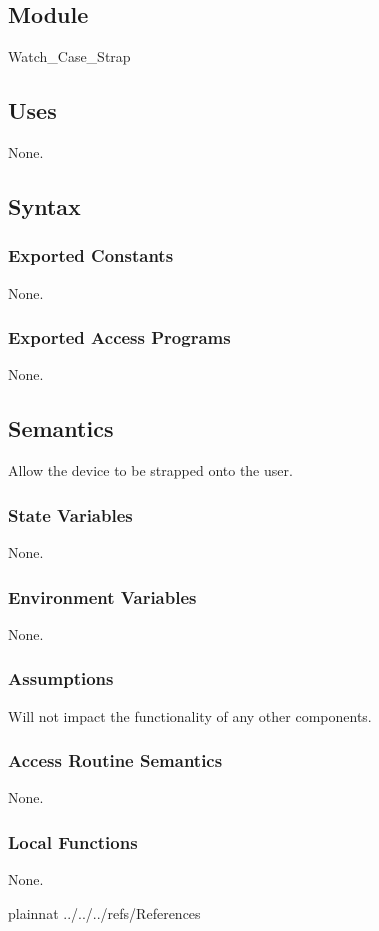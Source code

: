\documentclass[12pt, titlepage]{article}
\begin{document}
\subsection{Module}

Watch\_Case\_Strap

\subsection{Uses}

None.

\subsection{Syntax}


\subsubsection{Exported Constants}

None.

\subsubsection{Exported Access Programs}

None.

\subsection{Semantics}

Allow the device to be strapped onto the user.

\subsubsection{State Variables}

None.

\subsubsection{Environment Variables}

None.

\subsubsection{Assumptions}

Will not impact the functionality of any other components.

\subsubsection{Access Routine Semantics}

None.

\subsubsection{Local Functions}

None.

\newpage


 {plainnat}
 {../../../refs/References}
\end{document}
